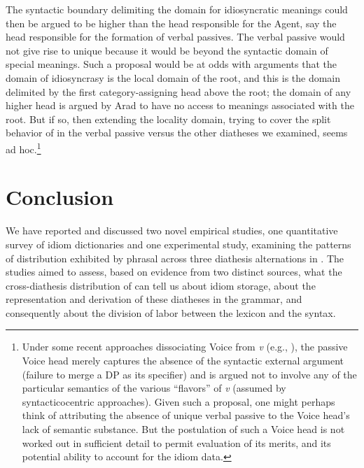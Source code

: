 \documentclass[output=paper]{langsci/langscibook}
\begin{document}
The syntactic boundary delimiting the domain for idiosyncratic meanings could
then be argued to be higher than the head responsible for the Agent, say the
head responsible for the formation of verbal passives. The verbal
passive would not give rise to unique  because it would
be beyond the syntactic domain of special meanings. Such a proposal would be at
odds with  arguments that the domain of idiosyncrasy is the
local domain of the root, and this is the domain delimited by the first
category-assigning head above the root; the domain of any higher head is argued
by Arad to have no access to meanings associated with the root. But if so, then
extending the locality domain, trying to cover the split behavior of
 in the verbal passive versus the other diatheses we examined,
seems ad hoc.\footnote{Under some recent approaches dissociating Voice from
    \emph{v} (e.g., \citealt{Harley2013}), the passive Voice head
    merely captures the absence of the syntactic external argument (failure to
    merge a DP as its specifier) and is argued not to involve any of the
    particular semantics of the various ``flavors'' of \emph{v} (assumed by
    syntacticocentric approaches). Given such a proposal, one might perhaps
    think of attributing the absence of unique verbal passive
     to the Voice head’s lack of semantic substance. But the
    postulation of such a Voice head is not worked out in sufficient detail to
permit evaluation of its merits, and its potential ability to account for the
idiom data.}

\section{Conclusion} %

We have reported and discussed two novel empirical studies, one quantitative
survey of idiom dictionaries and one experimental study, examining the patterns
of distribution exhibited by phrasal  across three diathesis alternations
in . The studies aimed to assess, based on evidence from two distinct
sources, what the cross-diathesis distribution of  can tell us about
idiom storage, about the representation and derivation of these diatheses in
the grammar, and consequently about the division of labor between the lexicon
and the syntax.
\end{document}
